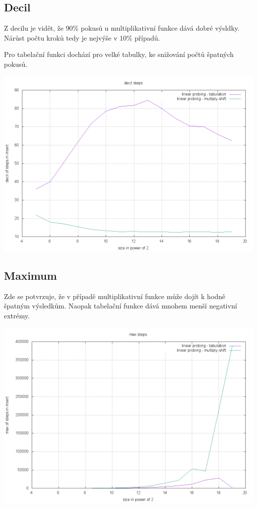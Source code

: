 \documentclass[12pt,a4paper]{report}
\begin{document}
\subsection*{Decil}
Z decilu je vidět, že $90 \%$ pokusů u multiplikativní funkce dává dobré výsldky.
Nárůst počtu kroků tedy je nejvýše v $10 \%$ případů.

Pro tabelační funkci dochází pro velké tabulky, ke snižování počtů špatných pokusů.

\includegraphics[width=\textwidth]{./tests/sequence_test/sequential-decil-test.png}


\subsection*{Maximum}
Zde se potvrzuje, že v případě multiplikativní funkce může dojít k hodně špatným výsledkům.
Naopak tabelační funkce dává  mnohem menší negativní extrémy.

\includegraphics[width=\textwidth]{./tests/sequence_test/sequential-max-test.png}
\end{document}
